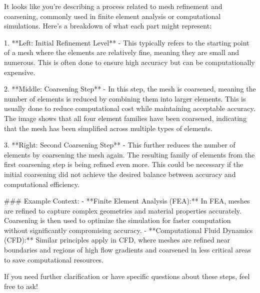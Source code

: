It looks like you're describing a process related to mesh refinement and coarsening, commonly used in finite element analysis or computational simulations. Here's a breakdown of what each part might represent:

1. **Left: Initial Refinement Level**
   - This typically refers to the starting point of a mesh where the elements are relatively fine, meaning they are small and numerous. This is often done to ensure high accuracy but can be computationally expensive.

2. **Middle: Coarsening Step**
   - In this step, the mesh is coarsened, meaning the number of elements is reduced by combining them into larger elements. This is usually done to reduce computational cost while maintaining acceptable accuracy. The image shows that all four element families have been coarsened, indicating that the mesh has been simplified across multiple types of elements.

3. **Right: Second Coarsening Step**
   - This further reduces the number of elements by coarsening the mesh again. The resulting family of elements from the first coarsening step is being refined even more. This could be necessary if the initial coarsening did not achieve the desired balance between accuracy and computational efficiency.

### Example Context:
- **Finite Element Analysis (FEA):** In FEA, meshes are refined to capture complex geometries and material properties accurately. Coarsening is then used to optimize the simulation for faster computation without significantly compromising accuracy.
- **Computational Fluid Dynamics (CFD):** Similar principles apply in CFD, where meshes are refined near boundaries and regions of high flow gradients and coarsened in less critical areas to save computational resources.

If you need further clarification or have specific questions about these steps, feel free to ask!